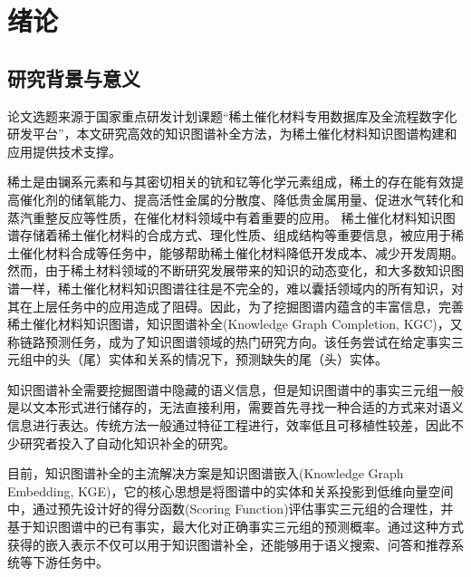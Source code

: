 \chapter{绪论}

\section{研究背景与意义}
论文选题来源于国家重点研发计划课题“稀土催化材料专用数据库及全流程数字化研发平台”，本文研究高效的知识图谱补全方法，为稀土催化材料知识图谱构建和应用提供技术支撑。

稀土是由镧系元素和与其密切相关的钪和钇等化学元素组成，稀土的存在能有效提高催化剂的储氧能力、提高活性金属的分散度、降低贵金属用量、促进水气转化和蒸汽重整反应等性质，在催化材料领域中有着重要的应用。
稀土催化材料知识图谱存储着稀土催化材料的合成方式、理化性质、组成结构等重要信息，被应用于稀土催化材料合成等任务中，能够帮助稀土催化材料降低开发成本、减少开发周期。然而，由于稀土材料领域的不断研究发展带来的知识的动态变化，和大多数知识图谱一样，稀土催化材料知识图谱往往是不完全的，难以囊括领域内的所有知识，对其在上层任务中的应用造成了阻碍。因此，为了挖掘图谱内蕴含的丰富信息，完善稀土催化材料知识图谱，知识图谱补全(Knowledge Graph Completion, KGC)，又称链路预测任务，成为了知识图谱领域的热门研究方向。该任务尝试在给定事实三元组中的头（尾）实体和关系的情况下，预测缺失的尾（头）实体。

知识图谱补全需要挖掘图谱中隐藏的语义信息，但是知识图谱中的事实三元组一般是以文本形式进行储存的，无法直接利用，需要首先寻找一种合适的方式来对语义信息进行表达。传统方法一般通过特征工程进行，效率低且可移植性较差，因此不少研究者投入了自动化知识补全的研究。

目前，知识图谱补全的主流解决方案是知识图谱嵌入(Knowledge Graph Embedding, KGE)，它的核心思想是将图谱中的实体和关系投影到低维向量空间中，通过预先设计好的得分函数(Scoring Function)评估事实三元组的合理性，并基于知识图谱中的已有事实，最大化对正确事实三元组的预测概率。通过这种方式获得的嵌入表示不仅可以用于知识图谱补全，还能够用于语义搜索、问答和推荐系统等下游任务中。

